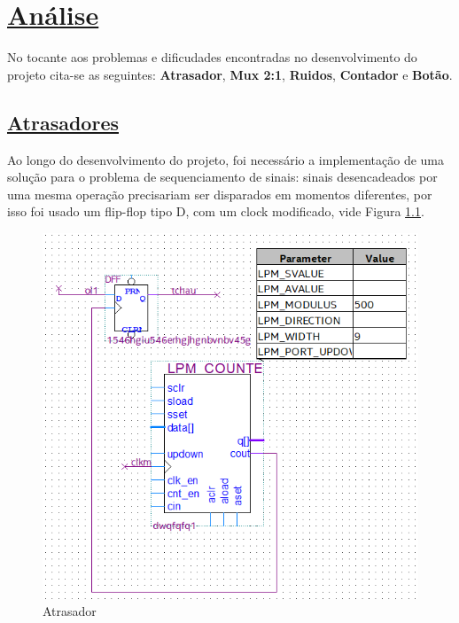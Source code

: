 \documentclass[14pt, oneside]{book}
\newcommand\tab[1][1cm]{\hspace*{#1}}
\theoremstyle{definition}
\begin{document}
            
        \chapter[Análise]{\hyperlink{toc}{Análise}} \hypertarget{ana}{}
            \tab No tocante aos problemas e dificudades encontradas no desenvolvimento do projeto cita-se as seguintes: \textbf{Atrasador}, \textbf{Mux 2:1}, \textbf{Ruidos}, \textbf{Contador} e \textbf{Botão}.
            
            \section[Atrasadores]{\hyperlink{toc}{Atrasadores}}
                \tab Ao longo do desenvolvimento do projeto, foi necessário a implementação de uma solução para o problema de sequenciamento de sinais: sinais desencadeados por uma mesma operação precisariam ser disparados em momentos diferentes, por isso foi usado um flip-flop tipo D, com um clock modificado, vide Figura \ref{fig:atrasador}.
                
                \begin{figure}[!h]
                    \centering
                    \includegraphics[scale=1]{atrasador.png}
                    \caption{Atrasador}
                    \label{fig:atrasador}
                \end{figure}
            
\end{document}
